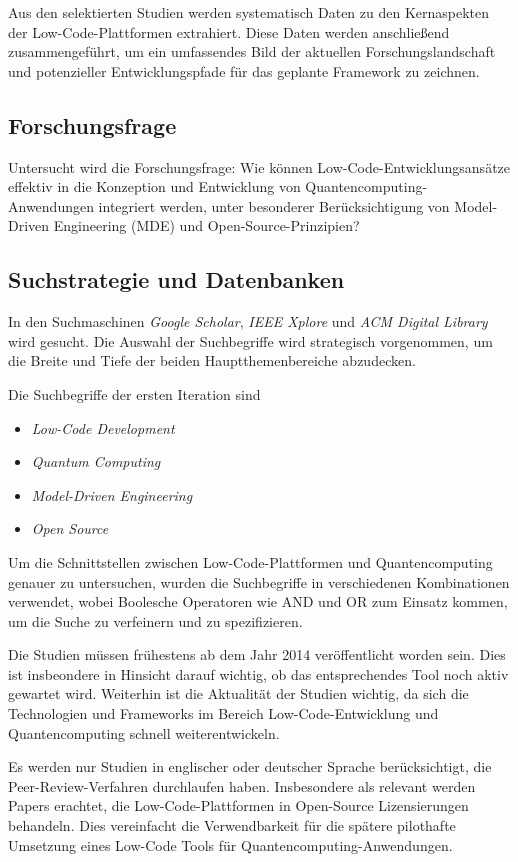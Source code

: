 Aus den selektierten Studien werden systematisch Daten zu den Kernaspekten der 
Low-Code-Plattformen extrahiert. Diese Daten werden anschließend zusammengeführt, um ein 
umfassendes Bild der aktuellen Forschungslandschaft und potenzieller Entwicklungspfade für 
das geplante Framework zu zeichnen.

\subsection{Forschungsfrage}
Untersucht wird die Forschungsfrage: Wie können Low-Code-Entwicklungsansätze 
effektiv in die Konzeption und Entwicklung von Quantencomputing-Anwendungen 
integriert werden, unter besonderer Berücksichtigung von Model-Driven 
Engineering (MDE) und Open-Source-Prinzipien?

\subsection{Suchstrategie und Datenbanken}
In den Suchmaschinen \textit{Google Scholar}, \textit{IEEE Xplore} und \textit{ACM Digital Library} 
wird gesucht. Die Auswahl der Suchbegriffe wird strategisch vorgenommen, um die Breite und Tiefe der beiden 
Hauptthemenbereiche abzudecken. 

Die Suchbegriffe der ersten Iteration sind
\begin{itemize}
    \item \textit{Low-Code Development} 
    \item \textit{Quantum Computing}
    \item \textit{Model-Driven Engineering}
    \item \textit{Open Source}
\end{itemize} 

Um die Schnittstellen zwischen Low-Code-Plattformen und Quantencomputing genauer zu untersuchen, 
wurden die Suchbegriffe in verschiedenen Kombinationen verwendet, wobei Boolesche Operatoren wie 
AND und OR zum Einsatz kommen, um die Suche zu verfeinern und zu spezifizieren.

Die Studien müssen frühestens ab dem Jahr 2014 veröffentlicht worden sein. Dies ist insbeondere in 
Hinsicht darauf wichtig, ob das entsprechendes Tool noch aktiv gewartet wird. 
Weiterhin ist die Aktualität der Studien wichtig, da sich die Technologien und Frameworks 
im Bereich Low-Code-Entwicklung und Quantencomputing schnell weiterentwickeln.

Es werden nur Studien in englischer oder deutscher Sprache berücksichtigt, die Peer-Review-Verfahren 
durchlaufen haben. Insbesondere als relevant werden Papers erachtet, die Low-Code-Plattformen 
in Open-Source Lizensierungen behandeln. Dies vereinfacht die Verwendbarkeit für 
die spätere pilothafte Umsetzung eines Low-Code Tools für Quantencomputing-Anwendungen.

